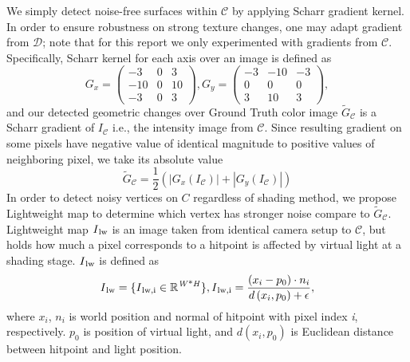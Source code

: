 We simply detect noise-free surfaces within $\mathcal{C}$ by applying Scharr gradient kernel. 
In order to ensure robustness on strong texture changes, one may adapt gradient from $\mathcal{D}$; note that for this report we only experimented with gradients from $\mathcal{C}$. 
Specifically, Scharr kernel for each axis over an image is defined as
\begin{equation}
    \label{eqn:01}
    G_x=\begin{pmatrix}
        -3 & 0 & 3\\
        -10 & 0 & 10\\
        -3 & 0 & 3
    \end{pmatrix}, 
    G_y=\begin{pmatrix}
        -3 & -10 & -3\\
        0 & 0 & 0\\
        3 & 10 & 3
    \end{pmatrix}
    ,
\end{equation}
and our detected geometric changes over Ground Truth color image $\widetilde{G}_\mathcal{C}$ is a Scharr gradient of $I_\mathcal{C}$ i.e., the intensity image from $\mathcal{C}$. 
Since resulting gradient on some pixels have negative value of identical magnitude to positive values of neighboring pixel, we take its absolute value
\begin{equation}
    \label{eqn:02}
    \widetilde{G}_\mathcal{C}=\frac{1}{2}\left(|G_x\left(I_\mathcal{C}\right)|+|G_y\left(I_\mathcal{C}\right)|\right)
\end{equation}
In order to detect noisy vertices on $C$ regardless of shading method, we propose Lightweight map to determine which vertex has stronger noise compare to $\widetilde{G}_\mathcal{C}$. 
Lightweight map $I\textsubscript{lw}$ is an image taken from identical camera setup to $\mathcal{C}$, but holds how much a pixel corresponds to a hitpoint is affected by virtual light at a shading stage.
$I\textsubscript{lw}$ is defined as
\begin{equation}
    I\textsubscript{lw}=\{I\textsubscript{lw,i}\in\mathbb{R}\textsuperscript{\textit{W}*\textit{H}}\}, I\textsubscript{lw,i}=\frac{\left(x_i-p_0\right)\cdot n_i}{d\left(x_i,p_0\right)+\epsilon}, 
\end{equation}
where $x_i$, $n_i$ is world position and normal of hitpoint with pixel index \textit{i}, respectively. 
$p_0$ is position of virtual light,  and $d\left(x_i, p_0\right)$ is Euclidean distance between hitpoint and light position. 

